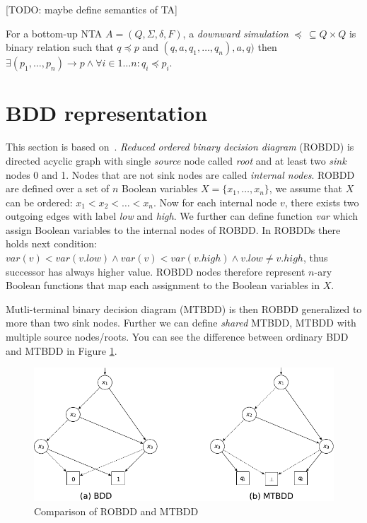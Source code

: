 \documentclass[a4paper, 12pt]{article}
\begin{document}
[TODO: maybe define semantics of TA]


For a bottom-up NTA $A=(Q, \Sigma, \delta, F)$, a \emph{downward simulation} $\preceq\, \subseteq Q\times Q$ is binary relation such that $q \preceq p$
and $(q,a,q_1,\ldots, q_n),a,q)$ then $\exists (p_1, \ldots, p_n) \rightarrow p \wedge \forall i \in {1 \ldots n}: q_i \preceq p_i$.

\section{BDD representation}
\label{sec:bdd}

This section is based on~\cite{fiedor:wsks}. \textit{Reduced ordered binary decision diagram} (ROBDD) is directed acyclic graph with single \textit{source} node called \textit{root} and at least two \textit{sink} nodes 0 and 1. Nodes that are not sink nodes are called \textit{internal nodes}. ROBDD are defined over a set of $n$ Boolean variables $X = \{x_1, \dots, x_n\}$, we assume that $X$ can be ordered: $x_1 < x_2 < \dots < x_n$. Now for each internal node $v$, there exists two outgoing edges with label \textit{low} and \textit{high}. We further can define function \textit{var} which assign Boolean variables to the internal nodes of ROBDD. In ROBDDs there holds next condition: $var(v) < var(v.low) \wedge var(v) < var(v.high) \wedge v.low \neq v.high$, thus successor has always higher value. ROBDD nodes therefore represent $n$-ary Boolean functions that map each assignment to the Boolean variables in $X$.

Mutli-terminal binary decision diagram (MTBDD) is then ROBDD generalized to more than two sink nodes. Further we can define \textit{shared} MTBDD, MTBDD with multiple source nodes/roots. You can see the difference between ordinary BDD and MTBDD in Figure \ref{fig:15860}.

\begin{figure}[h]
	\centering
	\includegraphics[width=0.7\linewidth]{15860.pdf}
	\caption{Comparison of ROBDD and MTBDD \cite{fiedor:wsks}}
	\label{fig:15860}
\end{figure}
\end{document}
